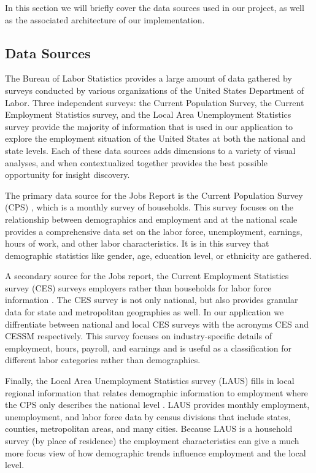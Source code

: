 \documentclass[journal]{IEEEtran}
\begin{document}
{In this section we will briefly cover the data sources used in our project, as well as the associated architecture of our implementation.

\subsection{Data Sources}

The Bureau of Labor Statistics provides a large amount of data gathered by surveys conducted by various organizations of the United States Department of Labor. Three independent surveys: the Current Population Survey, the Current Employment Statistics survey, and the Local Area Unemployment Statistics survey provide the majority of information that is used in our application to explore the employment situation of the United States at both the national and state levels. Each of these data sources adds dimensions to a variety of visual analyses, and when contextualized together provides the best possible opportunity for insight discovery.

The primary data source for the Jobs Report is the Current Population Survey (CPS) \cite{_labor_????}, which is a monthly survey of households. This survey focuses on the relationship between demographics and employment and at the national scale provides a comprehensive data set on the labor force, unemployment, earnings, hours of work, and other labor characteristics. It is in this survey that demographic statistics like gender, age, education level, or ethnicity are gathered.

A secondary source for the Jobs report, the Current Employment Statistics survey (CES) surveys employers rather than households for labor force information \cite{_current_2015}. The CES survey is not only national, but also provides granular data for state and metropolitan geographies as well. In our application we diffrentiate between national and local CES surveys with the acronyms CES and CESSM respectively. This survey focuses on industry-specific details of employment, hours, payroll, and earnings and is useful as a classification for different labor categories rather than demographics.

Finally, the Local Area Unemployment Statistics survey (LAUS) fills in local regional information that relates demographic information to employment where the CPS only describes the national level \cite{_local_2015}. LAUS provides monthly employment, unemployment, and labor force data by census divisions that include states, counties, metropolitan areas, and many cities. Because LAUS is a household survey (by place of residence) the employment characteristics can give a much more focus view of how demographic trends influence employment and the local level.

}
\end{document}
